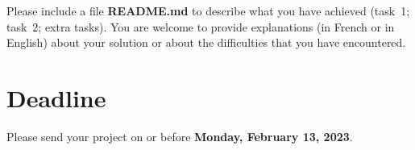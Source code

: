 \documentclass{article}
\begin{document}
Please include a file \textbf{README.md} to describe what you have achieved
(task~1; task~2; extra tasks). You are welcome to provide explanations (in
French or in English) about your solution or about the difficulties that you
have encountered.


\section{Deadline}

Please send your project on or before
\textbf{Monday, February 13, 2023}.



\end{document}
